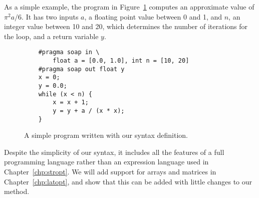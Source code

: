 As a simple example, the program in Figure~\ref{po:fig:syntax_example} computes
an approximate value of ${\pi^2 a}/6$.  It has two inputs $a$, a floating point
value between 0 and 1, and $n$, an integer value between 10 and 20, which
determines the number of iterations for the loop, and a return variable $y$.

\begin{figure}[ht]
    \begin{lstlisting}
    #pragma soap in \
        float a = [0.0, 1.0], int n = [10, 20]
    #pragma soap out float y
    x = 0;
    y = 0.0;
    while (x < n) {
        x = x + 1;
        y = y + a / (x * x);
    }
    \end{lstlisting}
    \caption{A simple program written with our syntax definition.}
    \label{po:fig:syntax_example}
\end{figure}

Despite the simplicity of our syntax, it includes all the features of
a full programming language rather than an expression language used in
Chapter~\ref{chp:stropt}.  We will add support for arrays and matrices in
Chapter~\ref{chp:latopt}, and show that this can be added with little changes
to our method.
